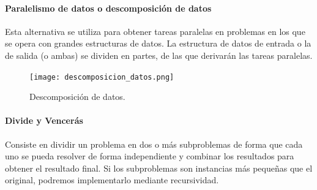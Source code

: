 \documentclass[12pt,spanish]{article}
\begin{document}
\paragraph{Paralelismo de datos o descomposición de datos}

Esta alternativa se utiliza para obtener tareas paralelas en problemas en los que se opera con grandes estructuras de datos. La estructura de datos de entrada o la de salida (o ambas) se dividen en partes, de las que derivarán las tareas paralelas.

\begin{figure}[H]
	\centering
	\texttt{[image: descomposicion\_datos.png]}
	\caption{Descomposición de datos.}
\end{figure}

\paragraph{Divide y Vencerás}

Consiste en dividir un problema en dos o más subproblemas de forma que cada uno se pueda resolver de forma independiente y combinar los resultados para obtener el resultado final. Si los subproblemas son instancias más pequeñas que el original, podremos implementarlo mediante recursividad.
\end{document}
